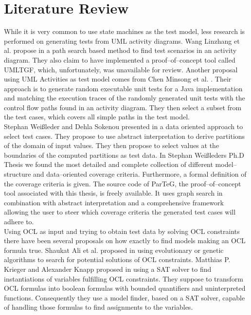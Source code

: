 \documentclass[runningheads,a4paper]{llncs}%
\begin{document}
\section{Literature Review}%
\label{sec:LiteratureReview}%
While it is very common to use state machines as the test model, less research is performed on generating tests from UML activity diagrams. Wang Linzhang et al. propose in \cite{Linzhang04GeneratingTestCasefromActivityGrayBoxMethod} a path search based method to find test scenarios in an activity diagram. They also claim to have implemented a proof--of--concept tool called UMLTGF, which, unfortunately, was unavailable for review. Another proposal using UML Activities as test model comes from Chen Minsong et al. \cite{mingsong2006automatic}. Their approach is to generate random executable unit tests for a Java implementation and matching the execution traces of the randomly generated unit tests with the control flow paths found in an activity diagram. They then select a subset from the test cases, which covers all simple paths in the test model.%
\\%
Stephan Wei{\ss}leder and Dehla Sokenou presented in \cite{weissleder2008automatic} a data oriented approach to select test cases. They propose to use abstract interpretation to derive partitions of the domain of input values. They then propose to select values at the boundaries of the computed partitions as test data.%
In Stephan Wei{\ss}leders Ph.D Thesis \cite{ParTeG} we found the most detailed and complete collection of different model--structure and data--oriented coverage criteria. Furthermore, a formal definition of the coverage criteria is given. The source code of ParTeG, the proof--of--concept tool associated with this thesis, is freely available. It uses graph search in combination with abstract interpretation and a comprehensive framework allowing the user to steer which coverage criteria the generated test cases will adhere to.\\
Using OCL as input and trying to obtain test data by solving OCL constraints there have been several proposals on how exactly to find models making an OCL formula true. Shaukat Ali et al. proposed in \cite{ali2011search} using evolutionary or genetic algorithms to search for potential solutions of OCL constraints. Matthias P. Krieger and Alexander Knapp proposed in \cite{krieger2008executingUnderspecifiedOCL} using a SAT solver to find instantiations of variables fulfilling OCL constraints. They suppose to transform OCL formulas into boolean formulas with bounded quantifiers and uninterpreted functions. Consequently they use a model finder, based on a SAT solver, capable of handling those formulas to find assignments to the variables.\\%
\end{document}

